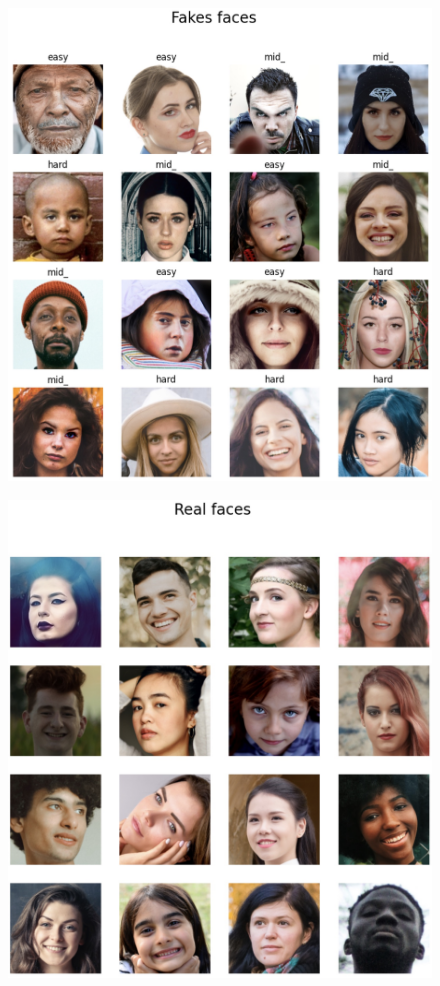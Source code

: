 \documentclass[rebuttal]{cvpr}
\begin{document}
\begin{itemize}
\begin{figure}[t]
\centering
\begin{minipage}{0.45\linewidth}
   \includegraphics[width=\linewidth]{images/Dataset1_Fakeface.jpg}
   \label{fig:image1}
\end{minipage}
\hfill
\begin{minipage}{0.45\linewidth}
   \includegraphics[width=\linewidth]{images/Dataset1_Realface.jpg}

\end{minipage}
\end{figure}
\end{itemize}
\end{document}
